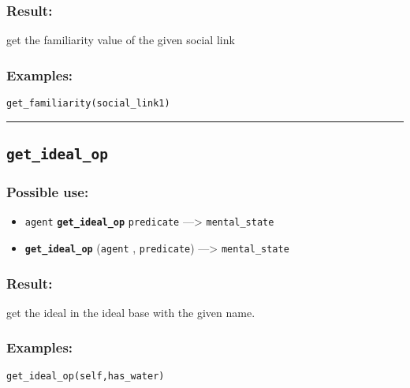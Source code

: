 \documentclass[]{book}
\providecommand{\tightlist}{%
  \setlength{\itemsep}{0pt}\setlength{\parskip}{0pt}}
\theoremstyle{definition}
\theoremstyle{definition}
\theoremstyle{definition}
\theoremstyle{remark}
\begin{document}
\subsubsection{Result:}\label{result-202}

get the familiarity value of the given social link

\subsubsection{Examples:}\label{examples-155}

\begin{verbatim}
get_familiarity(social_link1) 
\end{verbatim}

\begin{center}\rule{0.5\linewidth}{\linethickness}\end{center}

\subsection{\texorpdfstring{\texttt{get\_ideal\_op}}{get\_ideal\_op}}\label{get_ideal_op}

\subsubsection{Possible use:}\label{possible-use-209}

\begin{itemize}
\tightlist
\item
  \texttt{agent} \textbf{\texttt{get\_ideal\_op}} \texttt{predicate}
  ---\textgreater{} \texttt{mental\_state}
\item
  \textbf{\texttt{get\_ideal\_op}} (\texttt{agent} , \texttt{predicate})
  ---\textgreater{} \texttt{mental\_state}
\end{itemize}

\subsubsection{Result:}\label{result-203}

get the ideal in the ideal base with the given name.

\subsubsection{Examples:}\label{examples-156}

\begin{verbatim}
get_ideal_op(self,has_water) 
\end{verbatim}
\end{document}
